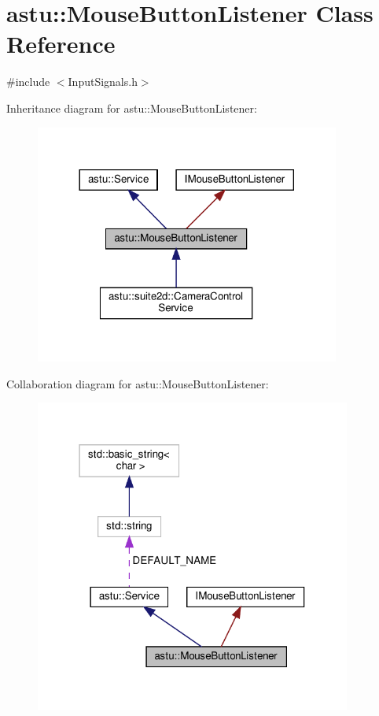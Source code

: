 \hypertarget{classastu_1_1MouseButtonListener}{}\section{astu\+:\+:Mouse\+Button\+Listener Class Reference}
\label{classastu_1_1MouseButtonListener}


{\ttfamily \#include $<$Input\+Signals.\+h$>$}



Inheritance diagram for astu\+:\+:Mouse\+Button\+Listener\+:\nopagebreak
\begin{figure}[H]
\begin{center}
\leavevmode
\includegraphics[width=284pt]{classastu_1_1MouseButtonListener__inherit__graph}
\end{center}
\end{figure}


Collaboration diagram for astu\+:\+:Mouse\+Button\+Listener\+:\nopagebreak
\begin{figure}[H]
\begin{center}
\leavevmode
\includegraphics[width=295pt]{classastu_1_1MouseButtonListener__coll__graph}
\end{center}
\end{figure}
